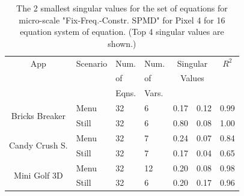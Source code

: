 \begin{table}[tb]
{\footnotesize
    \centering
    \caption{The 2 smallest singular values for the set of equations for micro-scale "Fix-Freq.-Constr. SPMD" for Pixel 4 for 16 equation system of equation.
    (Top 4 singular values are shown.)
    }
    \vspace{-0.1in}
    \begin{tabular}{|c|p{10.5mm}|p{7.5mm}|p{7.5mm}|c|c|c|}
    \hline
        App & Scenario & Num. & Num. &  \multicolumn{2}{c|}{Singular}  & $R^{2}$ \\
            &          &  of &   of &  \multicolumn{2}{c|}{Values}  &   \\
            &          & Eqns. & Vars. &  \multicolumn{2}{c|}{}  & \\
        \hline
         \multirow{2}{13mm}{Bricks Breaker} & Menu & 32 & 6  & 0.17  & 0.12 & 0.99 \\
         \cline{2-7}
         & Still &  32 & 6 & 0.80  & 0.08 & 1.00 \\
         \hline
         \multirow{2}{13mm}{Candy Crush S.} & Menu & 32 & 7 & 0.24  & 0.07 & 0.84 \\
         \cline{2-7}
         & Still & 32 & 7 & 0.17  & 0.04 & 0.65 \\
         \hline
        \multirow{2}{13mm}{Mini Golf 3D} & Menu & 32 & 12 & 0.20  & 0.08 & 0.98 \\
        \cline{2-7}
	     & Still & 32 & 6 & 0.20  & 0.17 & 0.96 \\
	     \hline
    \end{tabular}
    \label{tab:micro_rank_singular}
    \vspace{-0.1in}
}
\end{table}

